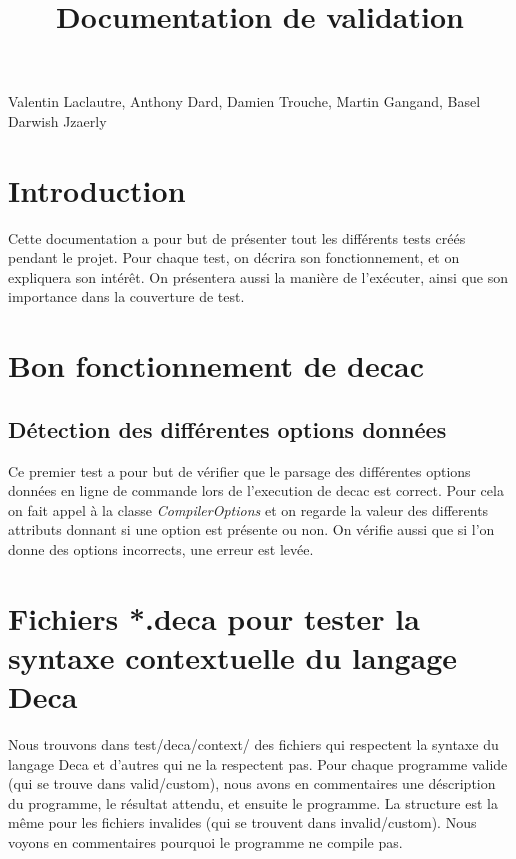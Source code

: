 \documentclass[12pt, a4paper, one side]{article}
\title{Documentation de validation}
\author{}
\date{}
\begin{document}
\maketitle

\begin{center}
    Valentin Laclautre, Anthony Dard, Damien Trouche, Martin Gangand, Basel Darwish Jzaerly
\end{center}

\tableofcontents

\newpage

\section{Introduction}

Cette documentation a pour but de présenter tout les différents tests créés pendant le projet.
Pour chaque test, on décrira son fonctionnement, et on expliquera son intérêt. On présentera aussi
la manière de l'exécuter, ainsi que son importance dans la couverture de test.

\section{Bon fonctionnement de decac}

\subsection{Détection des différentes options données}

Ce premier test a pour but de vérifier que le parsage des différentes options données en ligne
de commande lors de l'execution de decac est correct. Pour cela on fait appel à la classe \textit{CompilerOptions}
et on regarde la valeur des differents attributs donnant si une option est présente ou non. On vérifie aussi que si l'on
donne des options incorrects, une erreur est levée.

\section{Fichiers *.deca pour tester la syntaxe contextuelle du langage Deca}
Nous trouvons dans test/deca/context/ des fichiers qui respectent la syntaxe du langage Deca et d'autres qui ne la respectent pas.
Pour chaque programme valide (qui se trouve dans valid/custom), nous avons en commentaires une déscription du programme,
le résultat attendu, et ensuite le programme.
La structure est la même pour les fichiers invalides (qui se trouvent dans invalid/custom). Nous voyons en commentaires pourquoi le programme ne compile pas.
\end{document}
